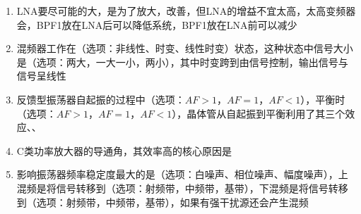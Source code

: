 \documentclass[12pt,a4paper]{ctexart}
\begin{document}
\begin{enumerate}[label=\arabic*、,leftmargin=2em]
    \item LNA要尽可能的大，是为了放大\underline{\hspace{3cm}}，改善\underline{\hspace{3cm}}，但LNA的增益不宜太高，太高变频器会\underline{\hspace{3cm}}，BPF1放在LNA后可以降低系统\underline{\hspace{3cm}}，BPF1放在LNA前可以减少\underline{\hspace{3cm}}
    
    \vspace{0.5cm}
    
    \item 混频器工作在\underline{\hspace{3cm}}（选项：非线性、时变、线性时变）状态，这种状态中信号大小是\underline{\hspace{3cm}}（选项：两大，一大一小，两小），其中时变跨到由\underline{\hspace{3cm}}信号控制，输出信号与\underline{\hspace{3cm}}信号呈线性
    
    \vspace{0.5cm}
    
    \item 反馈型振荡器自起振的过程中\underline{\hspace{3cm}}（选项：$AF>1$，$AF=1$，$AF<1$），平衡时\underline{\hspace{3cm}}（选项：$AF>1$，$AF=1$，$AF<1$），晶体管从自起振到平衡利用了其三个效应\underline{\hspace{3cm}}、\underline{\hspace{3cm}}、\underline{\hspace{3cm}}
    
    \vspace{0.5cm}
    
    \item C类功率放大器的导通角\underline{\hspace{3cm}}，其效率高的核心原因是\underline{\hspace{3cm}}
    
    \vspace{0.5cm}
    
    \item 影响振荡器频率稳定度最大的是\underline{\hspace{3cm}}（选项：白噪声、相位噪声、幅度噪声），上混频是将信号转移到\underline{\hspace{3cm}}（选项：射频带，中频带，基带），下混频是将信号转移到\underline{\hspace{3cm}}（选项：射频带，中频带，基带），如果有强干扰源还会产生\underline{\hspace{3cm}}混频
\end{enumerate}
\end{document}

